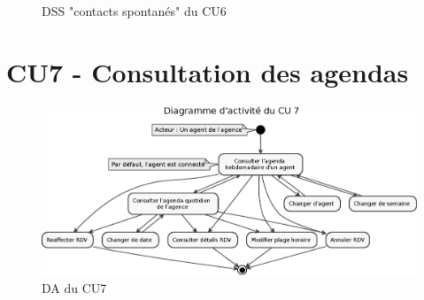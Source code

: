 \begin{figure}[H]
\noindent{}
\caption{DSS "contacts spontanés" du CU6}
\end{figure}


\section{CU7 - Consultation des agendas}
\begin{figure}[H]
\centering
\includegraphics[width=20cm, angle=90]{figures/eps/DA_CU7.eps}
\caption{DA du CU7}
\end{figure}


